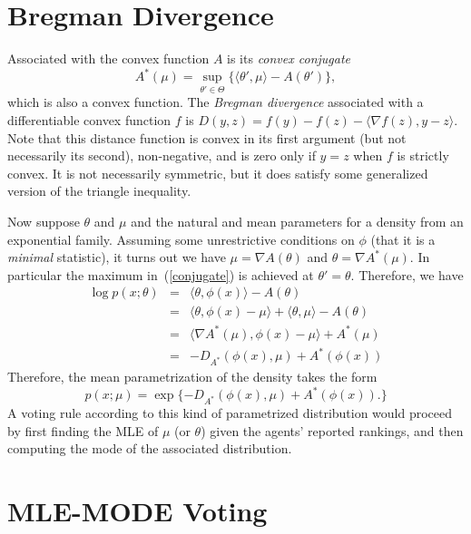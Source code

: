 \documentclass[10pt,letterpaper]{article}
\newcommand{\ip}[2]{\ensuremath{\langle #1, #2 \rangle}}
\newcommand{\grad}{\nabla}
\begin{document}

\section{Bregman Divergence}

Associated with the convex function $A$ is its \emph{convex conjugate}
%
\begin{equation} \label{conjugate}
A^*(\mu) = \sup_{\theta' \in \Theta} \{ \ip{\theta'}{\mu} - A(\theta') \},
\end{equation}
%
which is also a convex function. The \emph{Bregman divergence} associated with a differentiable convex function $f$ is $D(y,z) = f(y) - f(z) - \ip{\grad f(z)}{y-z}$. Note that this distance function is convex in its first argument (but not necessarily its second), non-negative, and is zero only if $y=z$ when $f$ is strictly convex. It is not necessarily symmetric, but it does satisfy some generalized version of the triangle inequality.

Now suppose $\theta$ and $\mu$ and the natural and mean parameters for a density from an exponential family. Assuming some unrestrictive conditions on $\phi$ (that it is a \emph{minimal} statistic), it turns out we have $\mu = \grad A(\theta)$ and $\theta = \grad A^*(\mu)$. In particular the maximum in~(\ref{conjugate}) is achieved at $\theta' = \theta$. Therefore, we have
%
\begin{eqnarray*}
\log p(x ; \theta) & = & \ip{\theta}{\phi(x)} - A(\theta) \\
& = & \ip{\theta}{\phi(x) - \mu} + \ip{\theta}{\mu} - A(\theta) \\
& = & \ip{\grad A^*(\mu)}{\phi(x) - \mu} + A^*(\mu) \\
& = & -D_{A^*}(\phi(x), \mu) + A^*(\phi(x))
\end{eqnarray*}
%
Therefore, the mean parametrization of the density takes the form
%
\begin{equation} \label{exp-mean}
p(x ; \mu) = \exp\{ -D_{A^*}(\phi(x), \mu) + A^*(\phi(x)). \}
\end{equation}
%
A voting rule according to this kind of parametrized distribution would proceed by first finding the MLE of $\mu$ (or $\theta$) given the agents' reported rankings, and then computing the mode of the associated distribution.






\section{MLE-MODE Voting}
\end{document}
